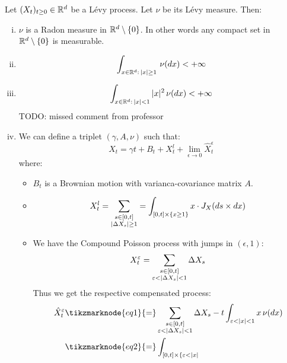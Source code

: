 \begin{definition}
    Let $(X_t)_{t\geq0}\in\R^d$ be a Lévy process. Let $\nu$ be its Lévy measure.
    Then: 
    \begin{enumerate}[i)]
        \item $\nu$ is a Radon measure in $\R^d\setminus\{0\}$. In other words
            any compact set in $\R^d\setminus\{0\}$ is measurable.
        \item \[ \int_{x\in\R^d: \, |x|\geq1} \, \nu(dx) < +\infty \]
        \item \[ \int_{x\in\R^d: \, |x|<1} |x|^2 \, \nu(dx) < +\infty \] TODO: missed comment from professor
        \item We can define a triplet $(\gamma, A, \nu)$ such that:
            \[ X_t = \gamma t + B_t + X_t^l + \lim_{\epsilon\to0}
            \hat{X}_t^{\epsilon} \]
            where:
            \begin{itemize}
                \item $B_t$ is a Brownian motion with varianca-covariance matrix
                    $A$.
                \item \[ X_t^l = \sum_{\begin{subarray}{c}
                    s\in [0,t] \\
                    |\Delta X_s| \geq 1 
                \end{subarray}} = \int_{[0,t]\times \{x \geq 1\}} x \cdot
                J_X(ds \times dx) \]
                \item We have the Compound Poisson process with jumps in 
                $(\epsilon, 1)$:
                \[ X^\epsilon_t = \sum_{\begin{subarray}{c}
                    s\in[0,t] \\ \epsilon < |\Delta X_s| < 1
                \end{subarray}} \Delta X_s \]
                Thus we get the respective compensated process:
                \begin{align*}
                    \hat{X}^\epsilon_t & \tikzmarknode{eq1}{=} \sum_{
                        \begin{subarray}{c}
                           s\in[0,t] \\ \epsilon < |\Delta X_s| < 1 
                        \end{subarray}
                    } \Delta X_s - t \int_{\epsilon
                    < |x| < 1} x \, \nu(dx) \\
                    & \tikzmarknode{eq2}{=} \int_{[0,t]\times \{\epsilon < |x|
}
\end{align*}
\end{itemize}
\end{enumerate}
\end{definition}

